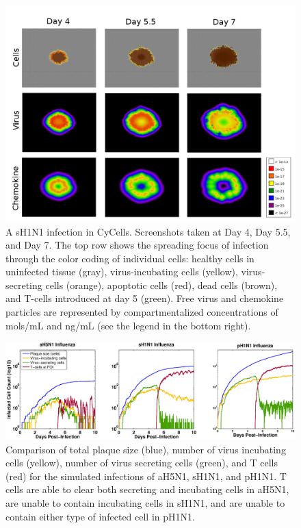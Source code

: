 \documentclass[10pt]{article}
\begin{document}
\begin{figure}[ht!]
\begin{center}
 \includegraphics[width=\textwidth]{cycells}
 \end{center}
\caption{A sH1N1 infection in CyCells. Screenshots taken at Day 4, Day 5.5, and Day 7.  The top row shows the spreading focus of infection  through the color coding of individual cells:  healthy cells in uninfected tissue (gray),  virus-incubating cells (yellow), virus-secreting cells (orange), apoptotic cells (red), dead cells (brown), and T-cells introduced at day 5 (green).  Free virus and chemokine particles are represented by compartmentalized concentrations of mols/mL and ng/mL (see the legend in the bottom right).} 
 \label{fig:cycells}
\end{figure}


\begin{figure}[ht!]
\begin{center}
 \includegraphics[width=\textwidth]{plaquesize}
 \end{center}
\caption{Comparison of total plaque size (blue), number of virus incubating cells (yellow), number of virus secreting cells (green), and T cells (red) for the simulated infections of aH5N1, sH1N1, and pH1N1.  T cells are able to clear both secreting and incubating cells in aH5N1, are unable to contain incubating cells in sH1N1, and are unable to contain either type of infected cell in pH1N1.} 
 \label{fig:plaquesize}
\end{figure}
\end{document}
